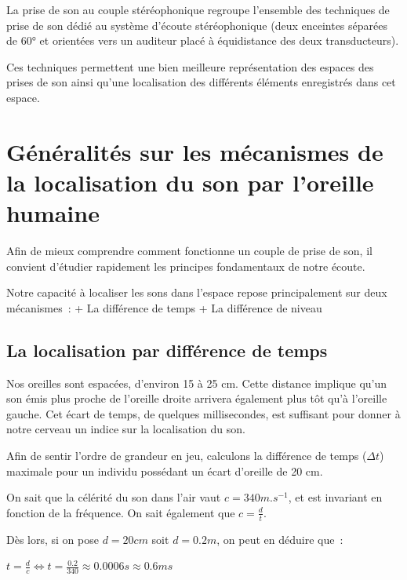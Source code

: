 \documentclass[
]{book}
\begin{document}
La prise de son au couple stéréophonique regroupe l'ensemble des techniques de prise de son dédié au système d'écoute stéréophonique (deux enceintes séparées de 60° et orientées vers un auditeur placé à équidistance des deux transducteurs).

Ces techniques permettent une bien meilleure représentation des espaces des prises de son ainsi qu'une localisation des différents éléments enregistrés dans cet espace.

\hypertarget{guxe9nuxe9ralituxe9s-sur-les-muxe9canismes-de-la-localisation-du-son-par-loreille-humaine}{%
\section{Généralités sur les mécanismes de la localisation du son par l'oreille humaine}\label{guxe9nuxe9ralituxe9s-sur-les-muxe9canismes-de-la-localisation-du-son-par-loreille-humaine}}

Afin de mieux comprendre comment fonctionne un couple de prise de son, il convient d'étudier rapidement les principes fondamentaux de notre écoute.

Notre capacité à localiser les sons dans l'espace repose principalement sur deux mécanismes~:
+ La différence de temps
+ La différence de niveau

\hypertarget{la-localisation-par-diffuxe9rence-de-temps}{%
\subsection{La localisation par différence de temps}\label{la-localisation-par-diffuxe9rence-de-temps}}

Nos oreilles sont espacées, d'environ 15 à 25 cm. Cette distance implique qu'un son émis plus proche de l'oreille droite arrivera également plus tôt qu'à l'oreille gauche. Cet écart de temps, de quelques millisecondes, est suffisant pour donner à notre cerveau un indice sur la localisation du son.

Afin de sentir l'ordre de grandeur en jeu, calculons la différence de temps (\(\Delta t\)) maximale pour un individu possédant un écart d'oreille de 20 cm.

On sait que la célérité du son dans l'air vaut \(c = 340 m.s^{-1}\), et est invariant en fonction de la fréquence. On sait également que \(c = \frac{d}{t}\).

Dès lors, si on pose \(d = 20 cm\) soit \(d = 0.2 m\), on peut en déduire que~:

\(t = \frac{d}{c} \iff t= \frac{0.2}{340} \approx 0.0006 s \approx 0.6 ms\)
\end{document}
